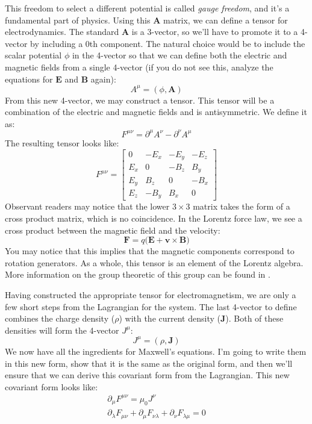This freedom to select a different potential is called \textit{gauge freedom}, and it's a fundamental part of physics. Using this $\bm{A}$ matrix, we can define a tensor for electrodynamics. The standard $\bm{A}$ is a 3-vector, so we'll have to promote it to a 4-vector by including a 0th component. The natural choice would be to include the scalar potential $\phi$ in the 4-vector so that we can define both the electric and magnetic fields from a single 4-vector (if you do not see this, analyze the equations for $\bm{E}$ and $\bm{B}$ again):
$$A^\mu=(\phi,\bm{A})$$
From this new 4-vector, we may construct a tensor. This tensor will be a combination of the electric and magnetic fields and is antisymmetric. We define it as:
$$F^{\mu\nu}=\partial^\mu A^\nu-\partial^\nu A^\mu$$
The resulting tensor looks like:
$$F^{\mu\nu}=\begin{bmatrix}
    0&-E_x&-E_y&-E_z\\
    E_x&0&-B_z&B_y\\
    E_y&B_z&0&-B_x\\
    E_z&-B_y&B_x&0
\end{bmatrix}$$
Observant readers may notice that the lower $3\times3$ matrix takes the form of a cross product matrix, which is no coincidence. In the Lorentz force law, we see a cross product between the magnetic field and the velocity:
$$\bm{F}=q(\bm{E}+\bm{v}\times\bm{B)}$$
You may notice that this implies that the magnetic components correspond to rotation generators. As a whole, this tensor is an element of the Lorentz algebra. More information on the group theoretic of this group can be found in \cite{zee_group_2016}.

Having constructed the appropriate tensor for electromagnetism, we are only a few short steps from the \gls{Lagrangian} for the system. The last 4-vector to define combines the charge density ($\rho$) with the current density ($\bm{J}$). Both of these densities will form the 4-vector $J^\mu$:
$$J^\mu=(\rho,\bm{J})$$
We now have all the ingredients for Maxwell's equations. I'm going to write them in this new form, show that it is the same as the original form, and then we'll ensure that we can derive this covariant form from the \gls{Lagrangian}. This new covariant form looks like:
\begin{gather}
    \partial_\mu F^{\mu\nu}=\mu_0J^\nu\\
    \partial_\lambda F_{\mu\nu}+\partial_\mu F_{\nu\lambda}+\partial_{\nu} F_{\lambda\mu}=0
\end{gather}

